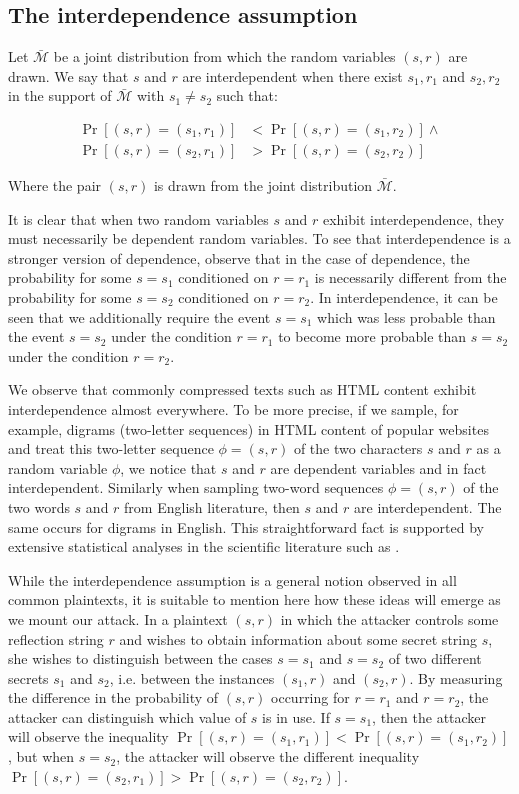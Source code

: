 \subsection{The interdependence assumption}\label{subsec:interdependence}

Let $\bar{\mathcal{M}}$ be a joint distribution from which the random variables
$(s, r)$ are drawn. We say that $s$ and $r$ are interdependent when there exist
$s_1, r_1$ and $s_2, r_2$ in the support of $\bar{\mathcal{M}}$ with $s_1 \neq
s_2$ such that:

\begin{align*}
    \Pr[(s, r) = (s_1, r_1)] &< \Pr[(s, r) = (s_1, r_2)]
\land\\
    \Pr[(s, r) = (s_2, r_1)] &> \Pr[(s, r) = (s_2, r_2)]
\end{align*}

Where the pair $(s, r)$ is drawn from the joint distribution
$\bar{\mathcal{M}}$.

It is clear that when two random variables $s$ and $r$ exhibit interdependence,
they must necessarily be dependent random variables. To see that
interdependence is a stronger version of dependence, observe that in the case
of dependence, the probability for some $s = s_1$ conditioned on $r = r_1$ is
necessarily different from the probability for some $s = s_2$ conditioned on $r
= r_2$. In interdependence, it can be seen that we additionally require the
event $s = s_1$ which was less probable than the event $s = s_2$ under the
condition $r = r_1$ to become more probable than $s = s_2$ under the condition
$r = r_2$.

We observe that commonly compressed texts such as HTML content exhibit
interdependence almost everywhere. To be more precise, if we sample, for
example, digrams (two-letter sequences) in HTML content of popular websites and
treat this two-letter sequence $\phi = (s, r)$ of the two characters $s$ and
$r$ as a random variable $\phi$, we notice that $s$ and $r$ are dependent
variables and in fact interdependent. Similarly when sampling two-word sequences
$\phi = (s, r)$ of the two words $s$ and $r$ from English literature, then $s$
and $r$ are interdependent. The same occurs for digrams in English. This
straightforward fact is supported by extensive statistical analyses in the
scientific literature such as \cite{mayzner1965tables}.

While the interdependence assumption is a general notion observed in all common
plaintexts, it is suitable to mention here how these ideas will emerge as we
mount our attack. In a plaintext $(s, r)$ in which the attacker controls some
reflection string $r$ and wishes to obtain information about some secret string
$s$, she wishes to distinguish between the cases $s = s_1$ and $s = s_2$ of two
different secrets $s_1$ and $s_2$, i.e. between the instances $(s_1, r)$ and
$(s_2, r)$. By measuring the difference in the probability of $(s, r)$
occurring for $r = r_1$ and $r = r_2$, the attacker can distinguish which value
of $s$ is in use. If $s = s_1$, then the attacker will observe the inequality
$\Pr[(s, r) = (s_1, r_1)] < \Pr[(s, r) = (s_1, r_2)]$, but when $s = s_2$, the
attacker will observe the different inequality $\Pr[(s, r) = (s_2, r_1)] >
\Pr[(s, r) = (s_2, r_2)]$.

